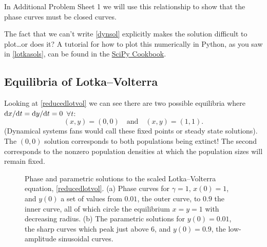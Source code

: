 \documentclass[main.tex]{subfiles}
\begin{document}
\begin{do-it-yourself}
	In Additional Problem Sheet 1 we will use this relationship to show that the phase curves must be closed curves. 
\end{do-it-yourself}

\begin{do-it-yourself}
	The fact that we can't write \cref{dynsol} explicitly makes the solution difficult to plot\ldots or does it? A tutorial for how to plot this numerically in Python, as you saw in \cref{lotkasols}, can be found in the \href{https://scipy-cookbook.readthedocs.io/items/LoktaVolterraTutorial.html}{SciPy Cookbook}.
\end{do-it-yourself}

\subsection{Equilibria of Lotka--Volterra}
\label{sec:equil-of-lv}
Looking at \cref{reducedlotvol} we can see there are two possible equilibria where $\fd{x}{t} = \fd{y}{t}=0$ $\forall t$:
\begin{equation}
\label{equlibria}
(x,y) = (0,0) \quad \mbox{and} \quad (x,y) = (1,1).
\end{equation}
(Dynamical systems fans would call these fixed points or steady state solutions). The $(0,0)$ solution corresponds to both populations being extinct! The second corresponds to the nonzero population densities at which the population sizes will remain fixed.    

\begin{figure}
\begin{subfigure}[t]{0.42\textwidth}
	\centering
	
\end{subfigure}
\begin{subfigure}[t]{0.56\textwidth}
	\centering
	
\end{subfigure}
\caption{\label{lotkacomp}Phase and parametric solutions to the scaled Lotka--Volterra equation, \cref{reducedlotvol}. (a) Phase curves for $\gamma=1$, $x(0)=1$, and $y(0)$ a set of values from $0.01$, the outer curve, to $0.9$ the inner curve, all of which circle the equilibrium $x=y=1$ with decreasing radius. (b) The parametric solutions for $y(0)=0.01$, the sharp curves which peak just above $6$, and $y(0)=0.9$, the low-amplitude sinusoidal curves.}
\end{figure}%
\end{document}
